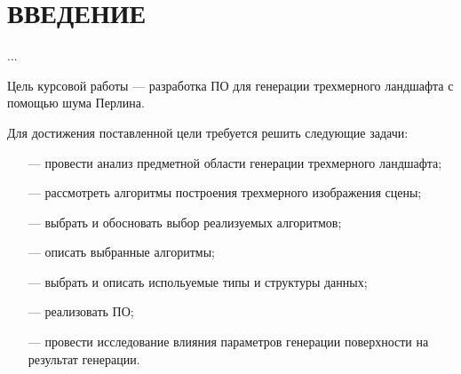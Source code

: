 \chapter*{\hfill{\centering ВВЕДЕНИЕ}\hfill}

...

Цель курсовой работы --- разработка ПО для генерации трехмерного ландшафта с помощью шума Перлина.

Для достижения поставленной цели требуется решить следующие задачи:
\begin{itemize}
	\item[---] провести анализ предметной области генерации трехмерного ландшафта;
	\item[---] рассмотреть алгоритмы построения трехмерного изображения сцены;
	\item[---] выбрать и обосновать выбор реализуемых алгоритмов;
	\item[---] описать выбранные алгоритмы;
	\item[---] выбрать и описать испольуемые типы и структуры данных;
	\item[---] реализовать ПО;
	\item[---] провести исследование влияния параметров генерации поверхности на результат генерации.
\end{itemize}